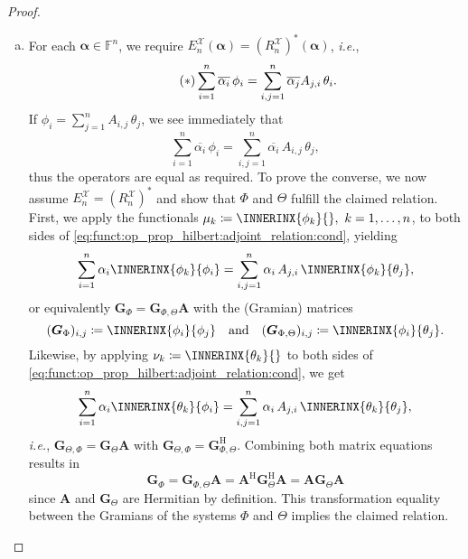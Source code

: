 \documentclass[a4paper]{paper}
\newcommand*{\SPC}[1]{{\ensuremath{\mathscr{#1}}}}
\newcommand{\FIELD}{{\ensuremath{\mathbb{F}}}}
\newcommand*{\Fn}{{\ensuremath{\FIELD^n}}}
\newcommand*{\EXT}[2]{\ensuremath{E_{#1}^{#2}}}
\newcommand*{\REST}[2]{\ensuremath{R_{#1}^{#2}}}
\newcommand*{\RnX}{{\ensuremath{\REST{n}{\SPC{X}}}}}
\newcommand*{\EnX}{{\ensuremath{\EXT{n}{\SPC{X}}}}}
\newcommand*{\HERM}[1]{{\ensuremath{#1^{\mathrm{H}}}}}
\newcommand{\ie}{\textsl{i.e.}\xspace}
\newcommand{\valpha}{\boldsymbol{\alpha}}
\newcommand{\vA}{\boldsymbol{A}}
\newcommand{\vG}{\boldsymbol{G}}
\begin{document}
\begin{proof}
\begin{enumerate}[(a)]
  \item For each $\valpha \in \Fn$, we require $\EnX(\valpha) = (\RnX)^*(\valpha)$, \ie,
  \begin{equation}
   \label{eq:funct:op_prop_hilbert:adjoint_relation:cond}
   \tag{{$\ast$}}
   \sum_{i=1}^n \overline{\alpha_i}\, \phi_i = \sum_{i,j=1}^n \overline{\alpha_j} A_{j,i}\, \theta_i.
  \end{equation}
  If $\phi_i = \sum_{j=1}^n A_{i,j}\, \theta_j$, we see immediately that
  \begin{equation*}
   \sum_{i=1}^n \overline{\alpha_i}\, \phi_i = \sum_{i,j=1}^n \overline{\alpha_i}\, A_{i,j}\, \theta_j,
  \end{equation*}
  thus the operators are equal as required. To prove the converse, we now assume $\EnX = (\RnX)^*$ and show that 
  $\Phi$ and $\Theta$ fulfill the claimed relation. First, we apply the functionals 
  $\mu_k \coloneqq  \INNERINX{\phi_k}{},\ k=1,\dotsc,n$, to both sides of 
  \eqref{eq:funct:op_prop_hilbert:adjoint_relation:cond}, yielding
  \begin{equation*}
   \sum_{i=1}^n \alpha_i \INNERINX{\phi_k}{\phi_i} = \sum_{i,j=1}^n \alpha_i\, A_{j,i}\, \INNERINX{\phi_k}{\theta_j},
  \end{equation*}
  or equivalently $\vG_{\Phi} = \vG_{\Phi,\Theta} \vA$ with the (Gramian) matrices
  \begin{equation*}
   (\vG_{\Phi})_{i,j} \coloneqq  \INNERINX{\phi_i}{\phi_j}
   \quad \text{and} \quad
   (\vG_{\Phi, \Theta})_{i,j} \coloneqq  \INNERINX{\phi_i}{\theta_j}.
  \end{equation*}
  Likewise, by applying $\nu_k \coloneqq  \INNERINX{\theta_k}{}$ to both sides of 
  \eqref{eq:funct:op_prop_hilbert:adjoint_relation:cond}, we get
  \begin{equation*}
   \sum_{i=1}^n \alpha_i \INNERINX{\theta_k}{\phi_i} = \sum_{i,j=1}^n \alpha_i\, A_{j,i}\, 
   \INNERINX{\theta_k}{\theta_j},
  \end{equation*}
  \ie, $\vG_{\Theta,\Phi} = \vG_\Theta \vA$ with $\vG_{\Theta,\Phi} = \HERM{\vG_{\Phi,\Theta}}$. Combining both matrix 
  equations results in
  \begin{equation*}
   \vG_{\Phi} = \vG_{\Phi,\Theta} \vA = \HERM{\vA} \HERM{\vG_\Theta} \vA = \vA \vG_\Theta \vA
  \end{equation*}
  since $\vA$ and $\vG_\Theta$ are Hermitian by definition. This transformation equality between the Gramians of the 
  systems $\Phi$ and $\Theta$ implies the claimed relation.
  

\end{enumerate}
\end{proof}
\end{document}
